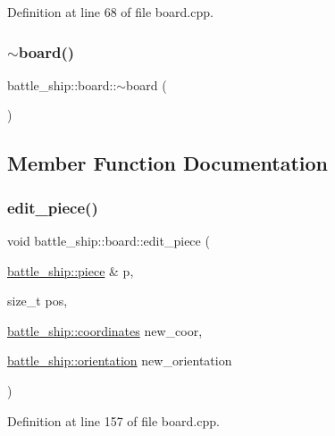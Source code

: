 Definition at line 68 of file board.\+cpp.

\mbox{\label{classbattle__ship_1_1board_a06d4ef9b5cb2dbb7aa4516464ff1ec52}} 
\subsubsection{\texorpdfstring{$\sim$board()}{~board()}}
{\footnotesize\ttfamily battle\+\_\+ship\+::board\+::$\sim$board (\begin{DoxyParamCaption}{ }\end{DoxyParamCaption})\hspace{0.3cm}{\ttfamily [default]}}



\subsection{Member Function Documentation}
\mbox{\label{classbattle__ship_1_1board_a3f6a458721d6f0cfbf167f5568539296}} 
\subsubsection{\texorpdfstring{edit\+\_\+piece()}{edit\_piece()}}
{\footnotesize\ttfamily void battle\+\_\+ship\+::board\+::edit\+\_\+piece (\begin{DoxyParamCaption}\item[{\hyperlink{classbattle__ship_1_1piece}{battle\+\_\+ship\+::piece} \&}]{p,  }\item[{size\+\_\+t}]{pos,  }\item[{\hyperlink{structbattle__ship_1_1coordinates}{battle\+\_\+ship\+::coordinates}}]{new\+\_\+coor,  }\item[{\hyperlink{namespacebattle__ship_aed87488f0a73f0d0679fe343fb61c784}{battle\+\_\+ship\+::orientation}}]{new\+\_\+orientation }\end{DoxyParamCaption})}



Definition at line 157 of file board.\+cpp.

